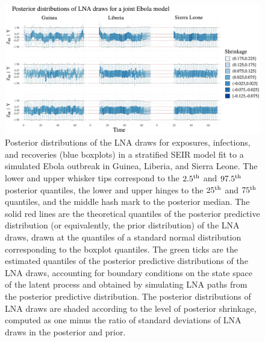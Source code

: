 \begin{figure}
	\begin{fullpage}
		\centering
		\includegraphics[width=\linewidth]{figures/ebola_synth_drawplots}
		\caption[Posterior distributions of LNA draws for a stratified SEIR model fit to a simulated Ebola outbreak.]{Posterior distributions of the LNA draws for exposures, infections, and recoveries (blue boxplots) in a stratified SEIR model fit to a simulated Ebola outbreak in Guinea, Liberia, and Sierra Leone. The lower and upper whisker tips correspond to the $ 2.5^{\mathrm{th}} $ and $ 97.5^{\mathrm{th}} $ posterior quantiles, the lower and upper hinges to the $ 25^{\mathrm{th}} $ and $ 75^{\mathrm{th}} $ quantiles, and the middle hash mark to the posterior median. The solid red lines are the theoretical quantiles of the posterior predictive distribution (or equivalently, the prior distribution) of the LNA draws, drawn at the quantiles of a standard normal distribution corresponding to the boxplot quantiles. The green ticks are the estimated quantiles of the posterior predictive distributions of the LNA draws, accounting for boundary conditions on the state space of the latent process and obtained by simulating LNA paths from the posterior predictive distribution.  The posterior distributions of LNA draws are shaded according to the level of posterior shrinkage, computed as one minus the ratio of standard deviations of LNA draws in the posterior and prior.}
		\label{fig:ebola_synth_drawplots}
	\end{fullpage}
\end{figure}

\newpage
